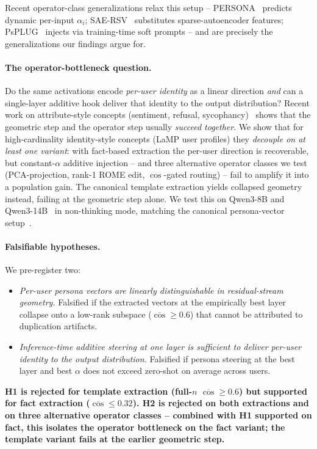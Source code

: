 \documentclass{article}
\begin{document}
Recent operator-class generalizations relax this setup --
PERSONA~\cite{persona2026} predicts dynamic per-input $\alpha_i$;
SAE-RSV~\cite{saersv2025} substitutes sparse-autoencoder features;
PsPLUG~\cite{psplug2026} injects via training-time soft prompts --
and are precisely the generalizations our findings argue for.

\paragraph{The operator-bottleneck question.}
Do the same activations encode \emph{per-user identity} as a linear
direction \emph{and} can a single-layer additive hook deliver that
identity to the output distribution? Recent work
on attribute-style concepts (sentiment, refusal,
sycophancy)~\cite{park2024linear,arditi2024refusal,rimsky2024caa,zou2023repe}
shows that the geometric step and the operator step usually
\emph{succeed together}.  We show that for high-cardinality
identity-style concepts (LaMP user profiles) they \emph{decouple
on at least one variant}: with fact-based extraction the per-user
direction is recoverable, but constant-$\alpha$ additive injection
-- and three alternative operator classes we test
(PCA-projection, rank-1 ROME edit, $\cos$-gated routing) -- fail to
amplify it into a population gain.  The canonical template
extraction yields collapsed geometry instead, failing at the
geometric step alone.
We test this on Qwen3-8B and Qwen3-14B~\cite{qwen3technicalreport}
in non-thinking mode, matching the canonical persona-vector
setup~\cite{chen2025persona}.

\paragraph{Falsifiable hypotheses.} We pre-register two:
\begin{itemize}
\item[\textbf{H1.}] \emph{Per-user persona vectors are linearly
  distinguishable in residual-stream geometry.} Falsified if the
  extracted vectors at the empirically best layer collapse onto a
  low-rank subspace ($\overline{\cos}\!\ge\!0.6$) that cannot be
  attributed to duplication artifacts.
\item[\textbf{H2.}] \emph{Inference-time additive steering at one
  layer is sufficient to deliver per-user identity to the output
  distribution.} Falsified if persona steering at the best layer and
  best $\alpha$ does not exceed zero-shot on average across users.
\end{itemize}
\textbf{H1 is rejected for template extraction
(full-$n$ $\overline{\cos}\!\ge\!0.6$) but supported for fact
extraction ($\overline{\cos}\!\le\!0.32$).  H2 is rejected on both
extractions and on three alternative operator classes -- combined
with H1 supported on fact, this isolates the operator bottleneck on
the fact variant; the template variant fails at the earlier
geometric step.}
\end{document}
